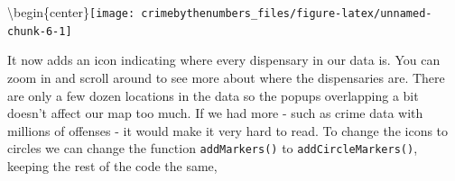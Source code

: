 \documentclass[
  12pt,
]{book}
\newenvironment{Shaded}{\begin{snugshade}}{\end{snugshade}}
\newcommand{\DataTypeTok}[1]{\textcolor[rgb]{0.27,0.27,0.27}{#1}}
\newcommand{\KeywordTok}[1]{\textcolor[rgb]{0.27,0.27,0.27}{\textbf{#1}}}
\newcommand{\NormalTok}[1]{#1}
\newcommand{\OperatorTok}[1]{\textcolor[rgb]{0.43,0.43,0.43}{\textbf{#1}}}
\newcommand{\StringTok}[1]{\textcolor[rgb]{0.5,0.5,0.5}{#1}}
\begin{document}
\begin{Shaded}
\end{Shaded}

\textbackslash begin\{center\}\texttt{[image: crimebythenumbers\_files/figure-latex/unnamed-chunk-6-1]}

It now adds an icon indicating where every dispensary in our data is. You can zoom in and scroll around to see more about where the dispensaries are. There are only a few dozen locations in the data so the popups overlapping a bit doesn't affect our map too much. If we had more - such as crime data with millions of offenses - it would make it very hard to read. To change the icons to circles we can change the function \texttt{addMarkers()} to \texttt{addCircleMarkers()}, keeping the rest of the code the same,

\begin{Shaded}
\end{Shaded}
\end{document}
